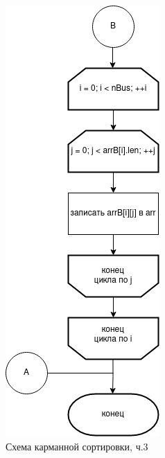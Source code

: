 \documentclass[12pt]{report}
\begin{document}
	\begin{figure}[H]
		\centering
		\includegraphics{bucket_3}
		\caption{Схема карманной сортировки, ч.3}
		\label{fig:schema_bucket_3}
	\end{figure}
	
\end{document}
